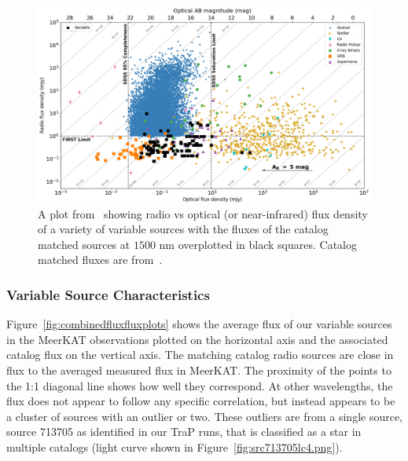 \documentclass[12pt]{article}
\begin{document}
\begin{figure}
	\includegraphics[width=\textwidth]{radio_opt_1500.0.png}
	\caption{A plot from~\citet{2018MNRAS.479.2481S} showing radio vs optical (or near-infrared) flux density of a variety of variable sources with the fluxes of the catalog matched sources at $1500$ nm overplotted in black squares. Catalog matched fluxes are from~\citet{2003yCat.2246....0C,2006AJ....131.1163S,2013Msngr.154...35M,2007MNRAS.379.1599L}.}
	\label{fig:stewartetalplot}
\end{figure}


\subsubsection{Variable Source Characteristics}
Figure~\ref{fig:combinedfluxfluxplots} shows the average flux of our variable sources in the MeerKAT observations plotted on the horizontal axis and the associated catalog flux on the vertical axis. The matching catalog radio sources are close in flux to the averaged measured flux in MeerKAT. The proximity of the points to the 1:1 diagonal line shows how well they correspond. At other wavelengths, the flux does not appear to follow any specific correlation, but instead appears to be a cluster of sources with an outlier or two. These outliers are from a single source, source 713705 as identified in our TraP runs, that is classified as a star in multiple catalogs (light curve shown in Figure~\ref{fig:src713705lc4.png}). 
\end{document}
